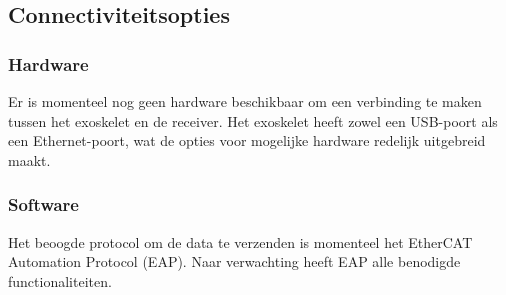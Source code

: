 \subsection{Connectiviteitsopties}
\subsubsection{Hardware}
Er is momenteel nog geen hardware beschikbaar om een verbinding te maken tussen het exoskelet en de receiver. Het exoskelet heeft zowel een USB-poort als een Ethernet-poort, wat de opties voor mogelijke hardware redelijk uitgebreid maakt.
\subsubsection{Software}
Het beoogde protocol om de data te verzenden is momenteel het EtherCAT Automation Protocol (EAP). Naar verwachting heeft EAP alle benodigde functionaliteiten.